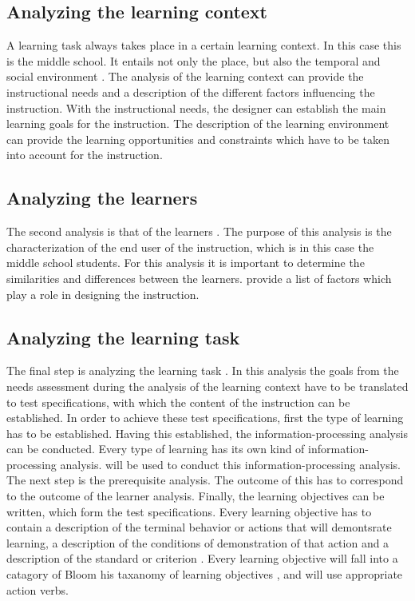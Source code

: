 \documentclass[12pt]{report} %
\begin{document}
\subsection{Analyzing the learning context}

A learning task always takes place in a certain learning context. In this case this is the middle school. It entails not only the place, but also the temporal and social environment \cite{smithragan}. The analysis of the learning context can provide the instructional needs and a description of the different factors influencing the instruction. With the instructional needs, the designer can establish the main learning goals for the instruction. The description of the learning environment can provide the learning opportunities and constraints which have to be taken into account for the instruction.

\subsection{Analyzing the learners}

The second analysis is that of the learners \cite{smithragan}. The purpose of this analysis is the characterization of the end user of the instruction, which is in this case the middle school students. For this analysis it is important to determine the similarities and differences between the learners.  provide a list of factors which play a role in designing the instruction.

\subsection{Analyzing the learning task}

The final step is analyzing the learning task \cite{smithragan}. In this analysis the goals from the needs assessment during the analysis of the learning context have to be translated to test specifications, with which the content of the instruction can be established. In order to achieve these test specifications, first the type of learning has to be established. Having this established, the information-processing analysis can be conducted. Every type of learning has its own kind of information-processing analysis.  will be used to conduct this information-processing analysis. The next step is the prerequisite analysis. The outcome of this has to correspond to the outcome of the learner analysis. Finally, the learning objectives can be written, which form the test specifications. Every learning objective has to contain a description of the terminal behavior or actions that will demontsrate learning, a description of the conditions of demonstration of that action and a description of the standard or criterion \cite{smithragan}. Every learning objective will fall into a catagory of Bloom his taxanomy of learning objectives \cite{bloom}, and will use appropriate action verbs.
\end{document}
